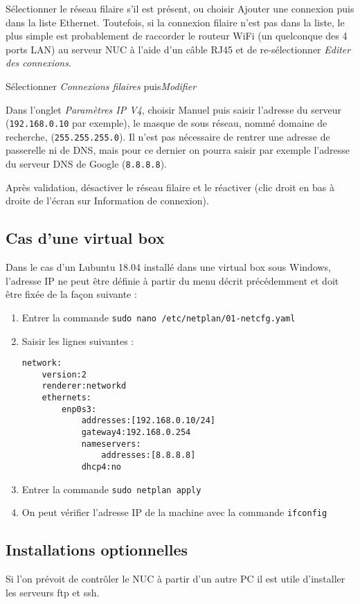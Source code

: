 \documentclass[a4paper]{ffco-rapport}
\begin{document}
	Sélectionner le réseau filaire s'il est présent, ou choisir \og{}Ajouter une connexion\fg{} puis dans la liste \og{}Ethernet\fg{}. Toutefois, si la connexion filaire n'est pas dans la liste, le plus simple est probablement de raccorder le routeur WiFi (un quelconque des 4 ports LAN) au serveur NUC à l'aide d'un câble RJ45 et de re-sélectionner \emph{Editer des connexions}.
	
	Sélectionner \emph{Connexions filaires} puis\emph{Modifier}
	
	Dans l'onglet \emph{Paramètres IP V4}, choisir \og{}Manuel\fg{} puis saisir l'adresse du serveur (\texttt{192.168.0.10} par exemple), le masque de sous réseau, nommé domaine de recherche, (\texttt{255.255.255.0}). Il n'est pas nécessaire de rentrer une adresse de passerelle ni de DNS, mais pour ce dernier on pourra saisir par exemple l'adresse du serveur DNS de Google (\texttt{8.8.8.8}).
	
	Après validation, désactiver le réseau filaire et le réactiver (clic droit en bas à droite de l'écran sur \og{}Information de connexion\fg{}).
	
	\subsection{Cas d'une \og{}virtual box\fg{}}
		Dans le cas d'un Lubuntu 18.04 installé dans une \og{}virtual box\fg{} sous Windows, l'adresse IP ne peut être définie à partir du menu décrit précédemment et doit être fixée de la façon suivante :
		
		\begin{enumerate}
			\item Entrer la commande \verb|sudo nano /etc/netplan/01-netcfg.yaml|
			\item Saisir les lignes suivantes :
				\begin{verbatim}
network:
	version:2
	renderer:networkd
	ethernets:
		enp0s3:
			addresses:[192.168.0.10/24]
			gateway4:192.168.0.254
			nameservers:
				addresses:[8.8.8.8]
			dhcp4:no
				\end{verbatim}
			\item Entrer la commande \verb|sudo netplan apply|
			\item On peut vérifier l'adresse IP de la machine avec la commande \verb|ifconfig|
		\end{enumerate}
	
	\subsection{Installations optionnelles}
	Si l'on prévoit de contrôler le NUC à partir d'un autre PC il est utile d'installer les serveurs ftp et ssh.
	
\end{document}
